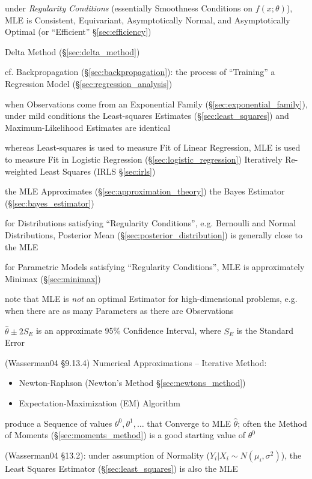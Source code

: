 under \emph{Regularity Conditions} (essentially Smoothness Conditions on
$f(x; \theta)$), MLE is Consistent, Equivariant, Asymptotically Normal, and
Asymptotically Optimal (or ``Efficient'' \S\ref{sec:efficiency})

\fist Delta Method (\S\ref{sec:delta_method})

cf. Backpropagation (\S\ref{sec:backpropagation}): the process of ``Training'' a
Regression Model (\S\ref{sec:regression_analysis})

when Observations come from an Exponential Family
(\S\ref{sec:exponential_family}), under mild conditions the Least-squares
Estimates (\S\ref{sec:least_squares}) and Maximum-Likelihood Estimates are
identical

whereas Least-squares is used to measure Fit of Linear Regression, MLE is used
to measure Fit in Logistic Regression (\S\ref{sec:logistic_regression}) \fist
Iteratively Re-weighted Least Squares (IRLS \S\ref{sec:irls})

the MLE Approximates (\S\ref{sec:approximation_theory}) the Bayes Estimator
(\S\ref{sec:bayes_estimator})

for Distributions satisfying ``Regularity Conditions'', e.g. Bernoulli and
Normal Distributions, Posterior Mean (\S\ref{sec:posterior_distribution}) is
generally close to the MLE

for Parametric Models satisfying ``Regularity Conditions'', MLE is approximately
Minimax (\S\ref{sec:minimax})

note that MLE is \emph{not} an optimal Estimator for high-dimensional problems,
e.g. when there are as many Parameters as there are Observations

$\hat{\theta} \pm 2\hat{S_E}$ is an approximate 95\% Confidence Interval, where
$S_E$ is the Standard Error

(Wasserman04 \S9.13.4) Numerical Approximations -- Iterative Method:
\begin{itemize}
  \item Newton-Raphson (Newton's Method \S\ref{sec:newtons_method})
  \item Expectation-Maximization (EM) Algorithm
\end{itemize}
produce a Sequence of values $\theta^0, \theta^1, \ldots$ that Converge to MLE
$\hat{\theta}$;
often the Method of Moments (\S\ref{sec:moments_method}) is a good starting
value of $\theta^0$

(Wasserman04 \S13.2):
 under assumption of Normality ($Y_i | X_i \sim N(\mu_i, \sigma^2)$), the Least
 Squares Estimator (\S\ref{sec:least_squares}) is also the MLE



